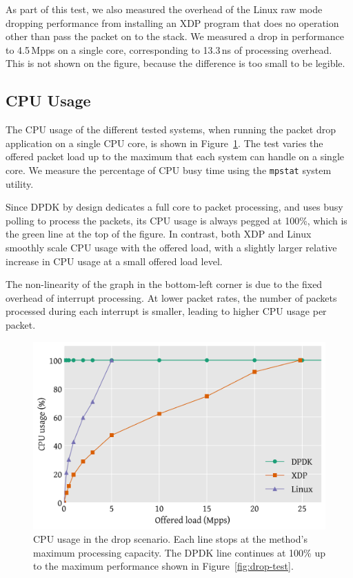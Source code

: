 \documentclass[sigconf]{acmart}
\begin{document}
As part of this test, we also measured the overhead of the Linux raw mode
dropping performance from installing an XDP program that does no operation other
than pass the packet on to the stack. We measured a drop in performance to
4.5\,Mpps on a single core, corresponding to 13.3\,ns of processing overhead.
This is not shown on the figure, because the difference is too small to be
legible.

\subsection{CPU Usage}
\label{sec:cpu-usage}

The CPU usage of the different tested systems, when running the packet drop
application on a single CPU core, is shown in Figure~\ref{fig:drop-cpu}. The
test varies the offered packet load up to the maximum that each system can
handle on a single core. We measure the percentage of CPU busy time using the
\texttt{mpstat} system utility.

Since DPDK by design dedicates a full core to packet processing, and uses busy
polling to process the packets, its CPU usage is always pegged at 100\%, which
is the green line at the top of the figure. In contrast, both XDP and Linux
smoothly scale CPU usage with the offered load, with a slightly larger relative
increase in CPU usage at a small offered load level.

The non-linearity of the graph in the bottom-left corner is due to the fixed
overhead of interrupt processing. At lower packet rates, the number of packets
processed during each interrupt is smaller, leading to higher CPU usage per
packet.

\begin{figure}[t]
\centering
\includegraphics[width=\linewidth]{figures/drop-cpu.pdf}
\caption{\label{fig:drop-cpu} CPU usage in the drop scenario. Each line stops at
  the method's maximum processing capacity. The DPDK line continues at 100\% up
  to the maximum performance shown in Figure~\ref{fig:drop-test}.}
\end{figure}
\end{document}
